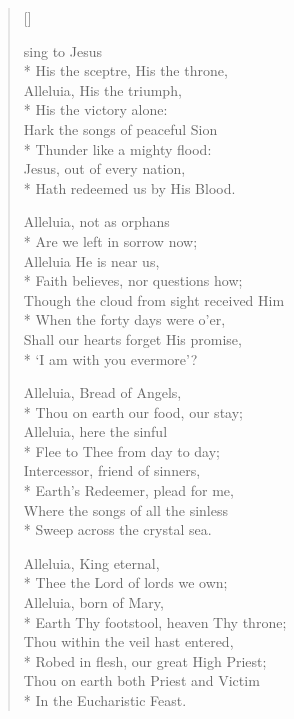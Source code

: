 \newHymn

\settowidth{\versewidth}{His the scepter his the throne}
\begin{verse}[\versewidth]
\begin{altverse}
 sing to Jesus\\*
His the sceptre, His the throne,\\
Alleluia, His the triumph,\\*
His the victory alone:\\
Hark the songs of peaceful Sion\\*
Thunder like a mighty flood:\\
Jesus, out of every nation,\\*
Hath redeemed us by His Blood.
\end{altverse}

\begin{altverse}
 Alleluia, not as orphans\\*
Are we left in sorrow now;\\
Alleluia He is near us,\\*
Faith believes, nor questions how;\\
Though the cloud from sight received Him\\*
When the forty days were o'er,\\
Shall our hearts forget His promise,\\*
`I am with you evermore'?
\end{altverse}

\begin{altverse}
 Alleluia, Bread of Angels,\\*
Thou on earth our food, our stay;\\
Alleluia, here the sinful \\*
Flee to Thee from day to day;\\
Intercessor, friend of sinners,\\*
Earth's Redeemer, plead for me,\\
Where the songs of all the sinless \\*
Sweep across the crystal sea.
\end{altverse}

\begin{altverse}
 Alleluia, King eternal,\\*
Thee the Lord of lords we own;\\
Alleluia, born of Mary,\\*
Earth Thy footstool, heaven Thy throne;\\
Thou within the veil hast entered,\\*
Robed in flesh, our great High Priest;\\
Thou on earth both Priest and Victim\\*
In the Eucharistic Feast.
\end{altverse}


\end{verse}


